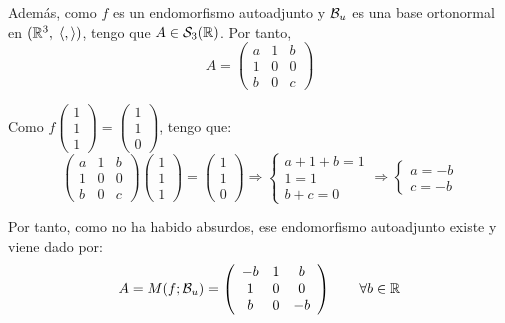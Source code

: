 \begin{ejercicio}
        Además, como $f$ es un endomorfismo autoadjunto y $\mathcal{B}_u$ es una base ortonormal en $(\mathbb{R}^3,\;\langle,\rangle)$, tengo que $A\in \mathcal{S}_3(\mathbb{R})$. Por tanto,
        \begin{equation*}
            A = \left(\begin{array}{ccc}
                a & 1 & b \\
                1 & 0 & 0 \\
                b & 0 & c
            \end{array}\right)
        \end{equation*}

    Como $f\left(\begin{array}{c}
            1 \\ 1 \\ 1
        \end{array} \right) = \left(\begin{array}{c}
            1 \\ 1 \\ 0
        \end{array} \right)$, tengo que:
    \begin{equation*}
        \left(\begin{array}{ccc}
            a & 1 & b \\
            1 & 0 & 0 \\
            b & 0 & c
        \end{array}\right)\left(\begin{array}{c}
            1 \\ 1 \\ 1
        \end{array} \right) = \left(\begin{array}{c}
            1 \\ 1 \\ 0
        \end{array} \right) \Longrightarrow \left\{\begin{array}{l}
            a+1+b=1\\
            1=1 \\
            b+c=0
        \end{array}\right.
        \Longrightarrow \left\{\begin{array}{l}
            a=-b\\
            c=-b
        \end{array}\right.
    \end{equation*}

    Por tanto, como no ha habido absurdos, ese endomorfismo autoadjunto existe y viene dado por:
    \begin{equation*}
            A = M(f;\mathcal{B}_u) = \left(\begin{array}{ccc}
                -b & 1 & b \\
                1 & 0 & 0 \\
                b & 0 & -b
            \end{array}\right) \qquad \forall b\in \mathbb{R}
        \end{equation*}
\end{ejercicio}

